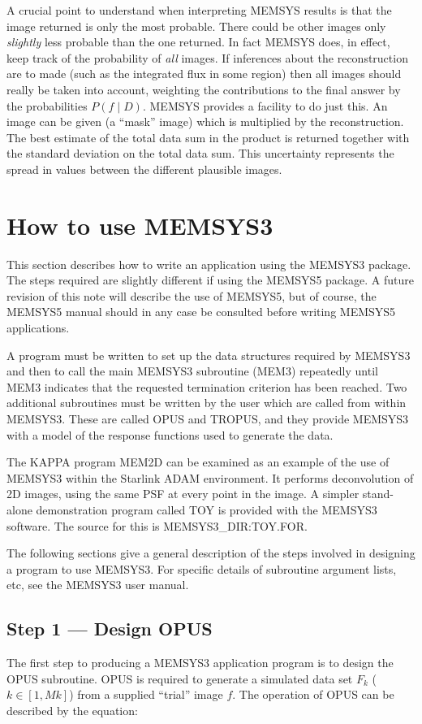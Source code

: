 A crucial point to understand when interpreting MEMSYS results is that the 
image returned is only the most probable. There could be other images only 
{\em slightly} less probable than the one returned. In fact MEMSYS does, in 
effect, keep track of the probability of {\em all} images. If inferences about 
the reconstruction are to made (such as the integrated flux in some region)
then all images should really be taken into account, weighting the contributions
to the final answer by the probabilities $P( f \mid D)$. MEMSYS provides a
facility to do just this. An image can be given (a ``mask'' image) which is 
multiplied by the
reconstruction. The best estimate of the total data sum in the product is
returned together with the standard deviation on the total data sum. This
uncertainty represents the spread in values between the different plausible
images. 


\section {How to use MEMSYS3}
\label {SEC:STEPS}
This section describes how to write an application using the MEMSYS3 package.
The steps required are slightly different if using the MEMSYS5 package. A 
future revision of this note will describe the use of MEMSYS5, but of course, 
the MEMSYS5 manual should in any case be consulted before writing MEMSYS5 
applications.

A program must be written to set up the data structures required by MEMSYS3 and 
then to call the main MEMSYS3 subroutine (MEM3) repeatedly until MEM3 indicates 
that the requested termination criterion has been reached. Two additional 
subroutines must be written by the user which are called from within MEMSYS3. 
These are called OPUS and TROPUS, and they provide MEMSYS3 with a model of the 
response functions used to generate the data.

The KAPPA program MEM2D can be examined as an example of the use of MEMSYS3 
within the Starlink ADAM environment. It performs deconvolution of 2D images, 
using the same PSF at every point in the image. A simpler stand-alone 
demonstration program called TOY is provided with the MEMSYS3 software. The 
source for this is MEMSYS3\_DIR:TOY.FOR.

The following sections give a general description of the steps involved in 
designing a program to use MEMSYS3. For specific details of subroutine argument 
lists, etc, see the MEMSYS3 user manual. 

\subsection {Step 1 --- Design OPUS}
The first step to producing a MEMSYS3 application program is to design the
OPUS subroutine.  OPUS is required to generate a simulated data set 
$F_{k}$ ($k\in[1,Mk]$) from a supplied ``trial'' image $f$.
The operation of OPUS can be described by the equation:

